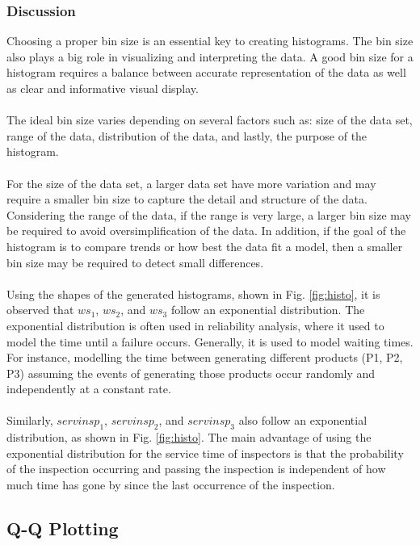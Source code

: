\documentclass[final, hidelinks, 12pt, a4paper]{article}
\begin{document}
    \subsubsection{Discussion}
    \label{sssct:discussion}
    Choosing a proper bin size is an essential key to creating histograms.
    The bin size also plays a big role in visualizing and interpreting the data.
    A good bin size for a histogram requires a balance between accurate representation of the data as well as clear and informative visual display.\\\\
    The ideal bin size varies depending on several factors such as: size of the data set, range of the data, distribution of the data, and lastly, the purpose of the histogram.\\\\
    For the size of the data set, a larger data set have more variation and may require a smaller bin size to capture the detail and structure of the data.
    Considering the range of the data, if the range is very large, a larger bin size may be required to avoid oversimplification of the data.
    In addition, if the goal of the histogram is to compare trends or how best the data fit a model, then a smaller bin size may be required to detect small differences.\\\\
    Using the shapes of the generated histograms, shown in Fig. \ref{fig:histo}, it is observed that $ws_1$, $ws_2$, and $ws_3$ follow an exponential distribution.
    The exponential distribution is often used in reliability analysis, where it used to model the time until a failure occurs.
    Generally, it is used to model waiting times.
    For instance, modelling the time between generating different products (P1, P2, P3) assuming the events of generating those products occur randomly and independently at a constant rate.\\\\
    Similarly, $servinsp_1$, $servinsp_2$, and $servinsp_3$ also follow an exponential distribution, as shown in Fig. \ref{fig:histo}.
    The main advantage of using the exponential distribution for the service time of inspectors is that the probability of the inspection occurring and passing the inspection is independent of how much time has gone by since the last occurrence of the inspection.
    \clearpage
    \subsection{Q-Q Plotting}
    \label{sct:qqPlot}
\end{document}
